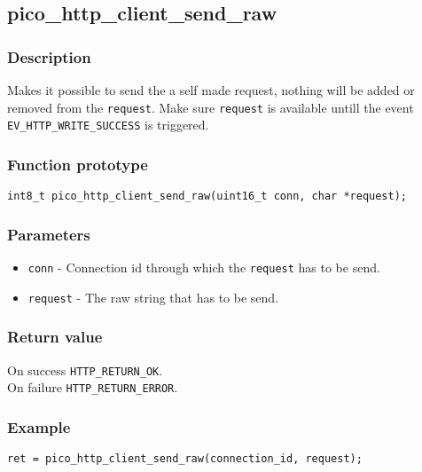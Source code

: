 
\subsection{pico\_http\_client\_send\_raw}

\subsubsection*{Description}
Makes it possible to send the a self made request, nothing will be added or removed from the \texttt{request}.
Make sure \texttt{request} is available untill the event \texttt{EV\_HTTP\_WRITE\_SUCCESS} is triggered.

\subsubsection*{Function prototype}
\texttt{int8\_t pico\_http\_client\_send\_raw(uint16\_t conn, char *request);}

\subsubsection*{Parameters}
\begin{itemize}[noitemsep]
\item \texttt{conn} - Connection id through which the \texttt{request} has to be send.
\item \texttt{request} - The raw string that has to be send. 
\end{itemize}

\subsubsection*{Return value}
On success \texttt{HTTP\_RETURN\_OK}.
\\On failure \texttt{HTTP\_RETURN\_ERROR}.

\subsubsection*{Example}
\begin{verbatim}
ret = pico_http_client_send_raw(connection_id, request);
\end{verbatim}


